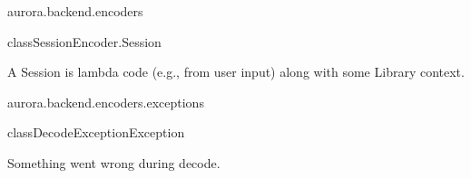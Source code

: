 \begin{texdocpackage}{aurora.backend.encoders}
\begin{texdocclass}{class}{SessionEncoder.Session}{}{}
\label{texdoclet:aurora.backend.encoders.SessionEncoder.Session}
\begin{texdocclassintro}
A Session is lambda code (e.g., from user input) along with some Library context.\end{texdocclassintro}
\begin{texdocclassfields}
\end{texdocclassfields}
\begin{texdocclassconstructors}
\end{texdocclassconstructors}
\end{texdocclass}


\end{texdocpackage}



\begin{texdocpackage}{aurora.backend.encoders.exceptions}
\label{texdoclet:aurora.backend.encoders.exceptions}

\begin{texdocclass}{class}{DecodeException}{Exception}{}
\label{texdoclet:aurora.backend.encoders.exceptions.DecodeException}
\begin{texdocclassintro}
Something went wrong during decode.\end{texdocclassintro}
\begin{texdocclassconstructors}
\end{texdocclassconstructors}
\end{texdocclass}


\end{texdocpackage}



